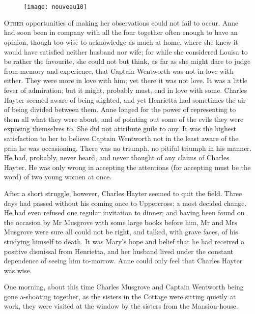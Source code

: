 \chapter[Chapter \thechapter]{}

\begin{figure}[t!]
\centering
\texttt{[image: nouveau10]}
\end{figure}

\lettrine[lines=4,lraise=0.3]{O}{ther} opportunities of making her observations could not fail to occur. Anne had soon been in company with all the four together often enough to have an opinion, though too wise to acknowledge as much at home, where she knew it would have satisfied neither husband nor wife; for while she considered Louisa to be rather the favourite, she could not but think, as far as she might dare to judge from memory and experience, that Captain Wentworth was not in love with either. They were more in love with him; yet there it was not love. It was a little fever of admiration; but it might, probably must, end in love with some. Charles Hayter seemed aware of being slighted, and yet Henrietta had sometimes the air of being divided between them. Anne longed for the power of representing to them all what they were about, and of pointing out some of the evils they were exposing themselves to. She did not attribute guile to any. It was the highest satisfaction to her to believe Captain Wentworth not in the least aware of the pain he was occasioning. There was no triumph, no pitiful triumph in his manner. He had, probably, never heard, and never thought of any claims of Charles Hayter. He was only wrong in accepting the attentions (for accepting must be the word) of two young women at once.

After a short struggle, however, Charles Hayter seemed to quit the field. Three days had passed without his coming once to Uppercross; a most decided change. He had even refused one regular invitation to dinner; and having been found on the occasion by Mr Musgrove with some large books before him, Mr and Mrs Musgrove were sure all could not be right, and talked, with grave faces, of his studying himself to death. It was Mary's hope and belief that he had received a positive dismissal from Henrietta, and her husband lived under the constant dependence of seeing him to-morrow. Anne could only feel that Charles Hayter was wise.

One morning, about this time Charles Musgrove and Captain Wentworth being gone a-shooting together, as the sisters in the Cottage were sitting quietly at work, they were visited at the window by the sisters from the Mansion-house.

